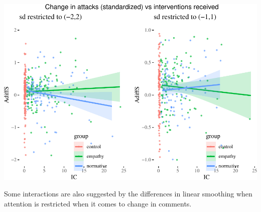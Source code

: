 \documentclass[10pt,dvipsnames,enabledeprecatedfontcommands]{scrartcl}
\begin{document}
\begin{center}\includegraphics[width=1\linewidth]{bayesianReport_files/figure-latex/unnamed-chunk-7-1} \end{center}

\normalsize

Some interactions are also suggested by the differences in linear
smoothing when attention is restricted when it comes to change in
comments.

\vspace{1mm} \footnotesize
\end{document}
